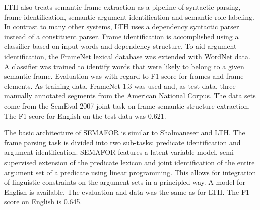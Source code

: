 \documentclass{llncs}
\begin{document}
LTH also treats semantic frame extraction as a pipeline of syntactic parsing,
frame identification, semantic argument identification and semantic role labeling.
In contrast to many other systems, 
LTH uses a dependency syntactic parser instead of a constituent parser.
Frame identification is accomplished using a classifier based on
input words and dependency structure.
To aid argument identification, the FrameNet lexical database was
extended with WordNet data. A classifier was trained to identify
words that were likely to belong to a given semantic frame.
Evaluation was with regard to F1-score for frames and frame elements.
As training data, FrameNet 1.3 was used and, as test data, three manually 
annotated segments from the American National Corpus. 
The data sets come from the SemEval 2007
joint task on frame semantic structure extraction.
The F1-score for English on the test data was 0.621.

The basic architecture of SEMAFOR is similar to Shalmaneser and LTH. 
The frame parsing task is divided into two sub-tasks: predicate identification and argument identification.
SEMAFOR features a latent-variable model, semi-supervised extension of the predicate lexicon and
joint identification of the entire argument set of a predicate using linear programming.
This allows for integration of linguistic constraints on the argument sets in a principled way.
A model for English is available. 
The evaluation and data was the same as for LTH. The F1-score on English is 0.645.


\end{document}
